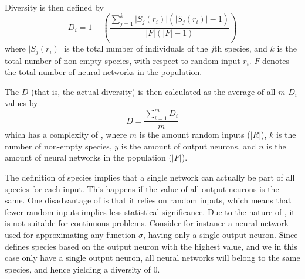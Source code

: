 Diversity is then defined by
%
\begin{equation*}\label{eq:sdi}
  D_i = 1 - \left(\frac{\sum_{j=1}^{k}\lvert S_j\left(r_i\right)\rvert\left(\lvert S_j\left(r_i\right)\rvert - 1\right)}{\lvert F\rvert \left(\lvert F\rvert - 1\right)}\right) 
\end{equation*}
%
where $\lvert S_j\left(r_i\right)\rvert$ is the total number of individuals of the $j$th species, and $k$ is the total number of non-empty species, with respect to random input $r_i$. %
$F$ denotes the total number of neural networks in the population. 

The \dia{} $D$ (that is, the actual diversity) is then calculated as the average of all $m$ $D_i$ values by
%
\[
D =\frac{\sum_{i=1}^m{D_i}}{m}
\]
%
which has a complexity of , where $m$ is the amount random inputs ($\lvert R \rvert$), $k$ is the number of non-empty species, $y$ is the amount of output neurons, and $n$ is the amount of neural networks in the population ($\lvert F\rvert$).

The definition of species implies that a single network can actually be part of all species for each input. This happens if the value of all output neurons is the same. One disadvantage of \dia{} is that it relies on random inputs, which means that fewer random inputs implies less statistical significance. Due to the nature of \dia, it is not suitable for continuous problems. Consider for instance a neural network used for approximating any function $\sigma$, having only a single output neuron. Since \dia{} defines species based on the output neuron with the highest value, and we in this case only have a single output neuron, all neural networks will belong to the same species, and hence yielding a diversity of 0.  
